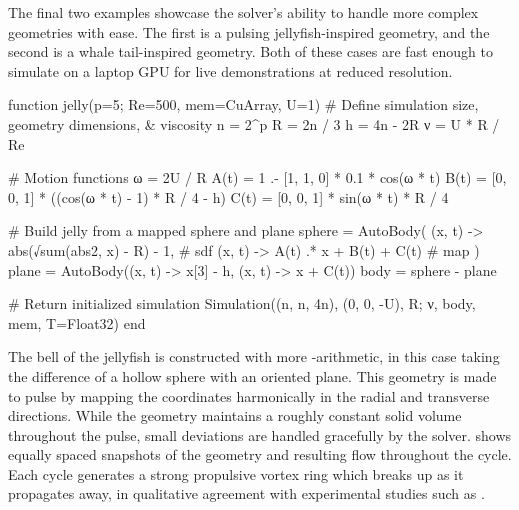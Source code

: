 \documentclass[10pt,a4paper]{article}
\begin{document}
The final two examples showcase the solver's ability to handle more complex geometries with ease. The first is a pulsing jellyfish-inspired geometry, and the second is a whale tail-inspired geometry. Both of these cases are fast enough to simulate on a laptop GPU for live demonstrations at reduced resolution.

\begin{minipage}{\linewidth}
\begin{jllisting}
function jelly(p=5; Re=500, mem=CuArray, U=1)
    # Define simulation size, geometry dimensions, & viscosity
    n = 2^p
    R = 2n / 3
    h = 4n - 2R
    ν = U * R / Re

    # Motion functions
    ω = 2U / R
    A(t) = 1 .- [1, 1, 0] * 0.1 * cos(ω * t)
    B(t) = [0, 0, 1] * ((cos(ω * t) - 1) * R / 4 - h)
    C(t) = [0, 0, 1] * sin(ω * t) * R / 4

    # Build jelly from a mapped sphere and plane
    sphere = AutoBody(
      (x, t) -> abs(√sum(abs2, x) - R) - 1, # sdf
      (x, t) -> A(t) .* x + B(t) + C(t)     # map
    )
    plane = AutoBody((x, t) -> x[3] - h, (x, t) -> x + C(t))
    body =  sphere - plane

    # Return initialized simulation
    Simulation((n, n, 4n), (0, 0, -U), R; ν, body, mem, T=Float32)
end
\end{jllisting}
\end{minipage}

The bell of the jellyfish is constructed with more -arithmetic, in this case taking the difference of a hollow sphere with an oriented plane. This geometry is made to pulse by mapping the coordinates harmonically in the radial and transverse directions. While the geometry maintains a roughly constant solid volume throughout the pulse, small deviations are handled gracefully by the solver.  shows equally spaced snapshots of the geometry and resulting flow throughout the cycle. Each cycle generates a strong propulsive vortex ring which breaks up as it propagates away, in qualitative agreement with experimental studies such as \cite{dabiri2005}.
\end{document}
